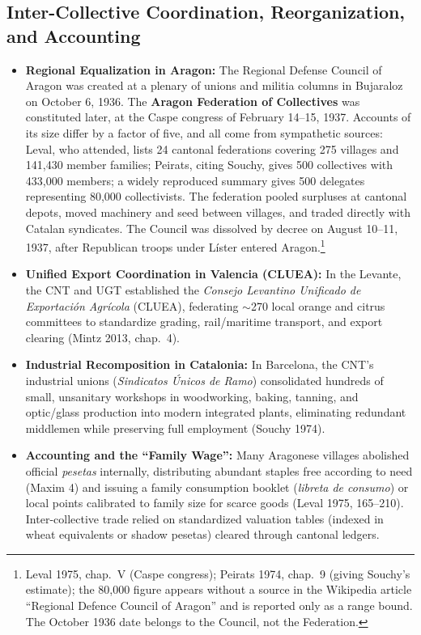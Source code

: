 \documentclass[10pt,twoside,openany]{book}
\theoremstyle{dpepstyle}
\begin{document}
\subsection{Inter-Collective Coordination, Reorganization, and Accounting}
\begin{itemize}[leftmargin=1.6em,itemsep=2pt]
  \item \textbf{Regional Equalization in Aragon:} The Regional Defense Council of Aragon was created at a plenary of unions and militia columns in Bujaraloz on October 6, 1936. The \textbf{Aragon Federation of Collectives} was constituted later, at the Caspe congress of February 14--15, 1937. Accounts of its size differ by a factor of five, and all come from sympathetic sources: Leval, who attended, lists 24 cantonal federations covering 275 villages and 141,430 member families; Peirats, citing Souchy, gives 500 collectives with 433,000 members; a widely reproduced summary gives 500 delegates representing 80,000 collectivists. The federation pooled surpluses at cantonal depots, moved machinery and seed between villages, and traded directly with Catalan syndicates. The Council was dissolved by decree on August 10--11, 1937, after Republican troops under L\'ister entered Aragon.\footnote{Leval 1975, chap.~V (Caspe congress); Peirats 1974, chap.~9 (giving Souchy's estimate); the 80,000 figure appears without a source in the Wikipedia article ``Regional Defence Council of Aragon'' and is reported only as a range bound. The October 1936 date belongs to the Council, not the Federation.}
  \item \textbf{Unified Export Coordination in Valencia (CLUEA):} In the Levante, the CNT and UGT established the \emph{Consejo Levantino Unificado de Exportaci\'on Agr\'icola} (CLUEA), federating $\sim$270 local orange and citrus committees to standardize grading, rail/maritime transport, and export clearing (Mintz 2013, chap.~4).
  \item \textbf{Industrial Recomposition in Catalonia:} In Barcelona, the CNT's industrial unions (\emph{Sindicatos \'Unicos de Ramo}) consolidated hundreds of small, unsanitary workshops in woodworking, baking, tanning, and optic/glass production into modern integrated plants, eliminating redundant middlemen while preserving full employment (Souchy 1974).
  \item \textbf{Accounting and the ``Family Wage'':} Many Aragonese villages abolished official \emph{pesetas} internally, distributing abundant staples free according to need (Maxim 4) and issuing a family consumption booklet (\emph{libreta de consumo}) or local points calibrated to family size for scarce goods (Leval 1975, 165--210). Inter-collective trade relied on standardized valuation tables (indexed in wheat equivalents or shadow pesetas) cleared through cantonal ledgers.
\end{itemize}
\end{document}
